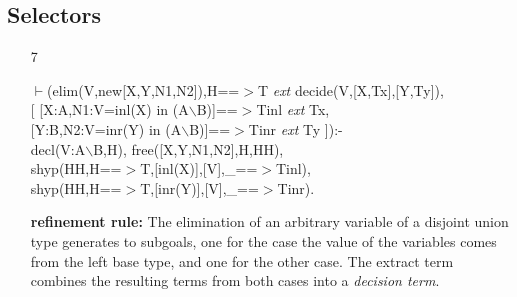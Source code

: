\documentclass[11pt]{report}
\begin{document}
 \subsection{Selectors}
  
 \begin{enumerate}
 \item[7]
\begin{sf}\begin{tabbing}
$\vdash$(elim(V,new[X,Y,N1,N2]),H==$>$T \mbox{\it ext} decide(V,[X,Tx],[Y,Ty]),\\[-0.15ex]
\hspace{2em}[ [X:A,N1:V=inl(X) in (A$\backslash$B)]==$>$Tinl \mbox{\it ext} Tx, \\[-0.15ex]
\hspace{3em}[Y:B,N2:V=inr(Y) in (A$\backslash$B)]==$>$Tinr \mbox{\it ext} Ty ]):-\\[-0.15ex]
\hspace{2em}decl(V:A$\backslash$B,H), free([X,Y,N1,N2],H,HH), \\[-0.15ex]
\hspace{2em}shyp(HH,H==$>$T,[inl(X)],[V],\_\hspace{0.1em}==$>$Tinl),\\[-0.15ex]
\hspace{2em}shyp(HH,H==$>$T,[inr(Y)],[V],\_\hspace{0.1em}==$>$Tinr).
\end{tabbing}\end{sf}

 {\bf refinement rule:}
 The elimination of an arbitrary variable of a disjoint
 union type generates to subgoals, one for the case the
 value of the variables comes from the left base type, and
 one for the other case. The extract term combines the
 resulting terms from both cases into a \emph{decision term}.
  

\end{enumerate}
\end{document}
